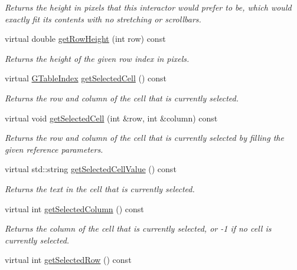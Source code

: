 \begin{DoxyCompactItemize}
\begin{DoxyCompactList}\small\item\em Returns the height in pixels that this interactor would prefer to be, which would exactly fit its contents with no stretching or scrollbars. \end{DoxyCompactList}\item 
virtual double \mbox{\hyperlink{classsgl_1_1GTable_a0215a742506665475b721ed12913808b}{get\+Row\+Height}} (int row) const
\begin{DoxyCompactList}\small\item\em Returns the height of the given row index in pixels. \end{DoxyCompactList}\item 
virtual \mbox{\hyperlink{structsgl_1_1GTableIndex}{G\+Table\+Index}} \mbox{\hyperlink{classsgl_1_1GTable_a4dd0c3a41bdf691fc2a92fe48f7a98f6}{get\+Selected\+Cell}} () const
\begin{DoxyCompactList}\small\item\em Returns the row and column of the cell that is currently selected. \end{DoxyCompactList}\item 
virtual void \mbox{\hyperlink{classsgl_1_1GTable_a29b4e2e079037922545996e08f7ce6c4}{get\+Selected\+Cell}} (int \&row, int \&column) const
\begin{DoxyCompactList}\small\item\em Returns the row and column of the cell that is currently selected by filling the given reference parameters. \end{DoxyCompactList}\item 
virtual std\+::string \mbox{\hyperlink{classsgl_1_1GTable_a8963c035a687a8393cd1f56ae05f582e}{get\+Selected\+Cell\+Value}} () const
\begin{DoxyCompactList}\small\item\em Returns the text in the cell that is currently selected. \end{DoxyCompactList}\item 
virtual int \mbox{\hyperlink{classsgl_1_1GTable_abeec6fda3c331aa187ba1b695b19d435}{get\+Selected\+Column}} () const
\begin{DoxyCompactList}\small\item\em Returns the column of the cell that is currently selected, or -\/1 if no cell is currently selected. \end{DoxyCompactList}\item 
virtual int \mbox{\hyperlink{classsgl_1_1GTable_adeb0b39683825191a8216d6cc3ca5072}{get\+Selected\+Row}} () const

\end{DoxyCompactItemize}
